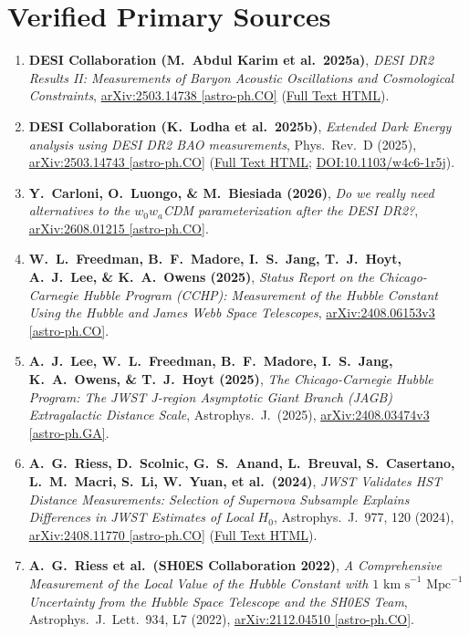 \documentclass[aps,prd,preprint,superscriptaddress,nofootinbib]{revtex4-2}
\begin{document}
\section{Verified Primary Sources}
\label{app:primarysources}
\small
\begin{enumerate}
    \setlength{\itemsep}{3pt}
    \item \textbf{DESI Collaboration (M.\ Abdul Karim et al.\ 2025a)}, \emph{DESI DR2 Results II: Measurements of Baryon Acoustic Oscillations and Cosmological Constraints}, \href{https://arxiv.org/abs/2503.14738}{arXiv:2503.14738 [astro-ph.CO]} (\href{https://arxiv.org/html/2503.14738v1}{Full Text HTML}).
    \item \textbf{DESI Collaboration (K.\ Lodha et al.\ 2025b)}, \emph{Extended Dark Energy analysis using DESI DR2 BAO measurements}, Phys.\ Rev.\ D (2025), \href{https://arxiv.org/abs/2503.14743}{arXiv:2503.14743 [astro-ph.CO]} (\href{https://arxiv.org/html/2503.14743v2}{Full Text HTML}; \href{https://link.aps.org/doi/10.1103/w4c6-1r5j}{DOI:10.1103/w4c6-1r5j}).
    \item \textbf{Y.\ Carloni, O.\ Luongo, \& M.\ Biesiada (2026)}, \emph{Do we really need alternatives to the $w_0 w_a$CDM parameterization after the DESI DR2?}, \href{https://arxiv.org/pdf/2608.01215}{arXiv:2608.01215 [astro-ph.CO]}.
    \item \textbf{W.\ L.\ Freedman, B.\ F.\ Madore, I.\ S.\ Jang, T.\ J.\ Hoyt, A.\ J.\ Lee, \& K.\ A.\ Owens (2025)}, \emph{Status Report on the Chicago-Carnegie Hubble Program (CCHP): Measurement of the Hubble Constant Using the Hubble and James Webb Space Telescopes}, \href{https://arxiv.org/abs/2408.06153}{arXiv:2408.06153v3 [astro-ph.CO]}.
    \item \textbf{A.\ J.\ Lee, W.\ L.\ Freedman, B.\ F.\ Madore, I.\ S.\ Jang, K.\ A.\ Owens, \& T.\ J.\ Hoyt (2025)}, \emph{The Chicago-Carnegie Hubble Program: The JWST J-region Asymptotic Giant Branch (JAGB) Extragalactic Distance Scale}, Astrophys.\ J.\ (2025), \href{https://arxiv.org/abs/2408.03474}{arXiv:2408.03474v3 [astro-ph.GA]}.
    \item \textbf{A.\ G.\ Riess, D.\ Scolnic, G.\ S.\ Anand, L.\ Breuval, S.\ Casertano, L.\ M.\ Macri, S.\ Li, W.\ Yuan, et al.\ (2024)}, \emph{JWST Validates HST Distance Measurements: Selection of Supernova Subsample Explains Differences in JWST Estimates of Local $H_0$}, Astrophys.\ J.\ 977, 120 (2024), \href{https://arxiv.org/abs/2408.11770}{arXiv:2408.11770 [astro-ph.CO]} (\href{https://arxiv.org/html/2408.11770v2}{Full Text HTML}).
    \item \textbf{A.\ G.\ Riess et al.\ (SH0ES Collaboration 2022)}, \emph{A Comprehensive Measurement of the Local Value of the Hubble Constant with $1\text{ km s}^{-1}\text{ Mpc}^{-1}$ Uncertainty from the Hubble Space Telescope and the SH0ES Team}, Astrophys.\ J.\ Lett.\ 934, L7 (2022), \href{https://arxiv.org/pdf/2112.04510}{arXiv:2112.04510 [astro-ph.CO]}.

\end{enumerate}
\end{document}
